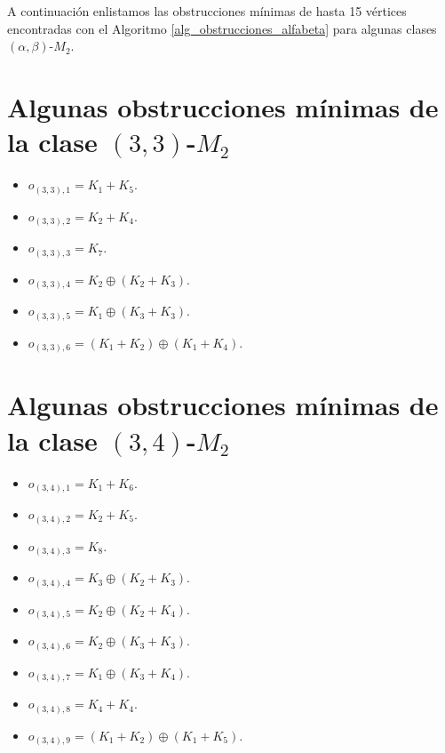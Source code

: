 A continuación enlistamos las obstrucciones mínimas de hasta 15 vértices encontradas con el Algoritmo \ref{alg_obstrucciones_alfabeta} para algunas clases $(\alpha,\beta)$-$M_2$.

\section{Algunas obstrucciones mínimas de la clase $(3,3)$-$M_2$}
\begin{itemize}
    \item $o_{(3,3),1} = K_1+K_5$.
    \item $o_{(3,3),2} = K_2+K_4$.
    \item $o_{(3,3),3} = K_7$.
    \item $o_{(3,3),4} = K_2\oplus(K_2+K_3)$.
    \item $o_{(3,3),5} = K_1\oplus(K_3+K_3)$.
    \item $o_{(3,3),6} = (K_1+K_2)\oplus(K_1+K_4)$.
\end{itemize}

\section{Algunas obstrucciones mínimas de la clase $(3,4)$-$M_2$}
\begin{itemize}
    \item $o_{(3,4),1} = K_1+K_6$.
    \item $o_{(3,4),2} = K_2+K_5$.
    \item $o_{(3,4),3} = K_8$.
    \item $o_{(3,4),4} = K_3\oplus(K_2+K_3)$.
    \item $o_{(3,4),5} = K_2\oplus(K_2+K_4)$.
    \item $o_{(3,4),6} = K_2\oplus(K_3+K_3)$.
    \item $o_{(3,4),7} = K_1\oplus(K_3+K_4)$.
    \item $o_{(3,4),8} = K_4+K_4$.
    \item $o_{(3,4),9} = (K_1+K_2)\oplus(K_1+K_5)$.
\end{itemize}

